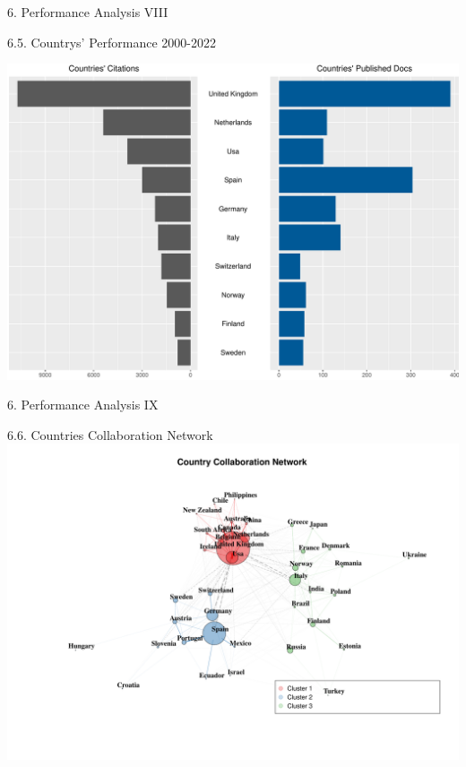 \documentclass[
  ignorenonframetext,
]{beamer}
\begin{document}
\begin{frame}{6. Performance Analysis VIII}
\protect\hypertarget{performance-analysis-viii}{}
\begin{block}{6.5. Countrys' Performance 2000-2022}
\protect\hypertarget{countrys-performance-2000-2022}{}
\vspace{0.5cm}

\includegraphics{Presentation_bibliometric_files/figure-beamer/Influencial CO-1.pdf}
\end{block}
\end{frame}

\begin{frame}{6. Performance Analysis IX}
\protect\hypertarget{performance-analysis-ix}{}
\begin{block}{6.6. Countries Collaboration Network}
\protect\hypertarget{countries-collaboration-network}{}
\includegraphics{Presentation_bibliometric_files/figure-beamer/Network CO-1.pdf}
\end{block}
\end{frame}
\end{document}
